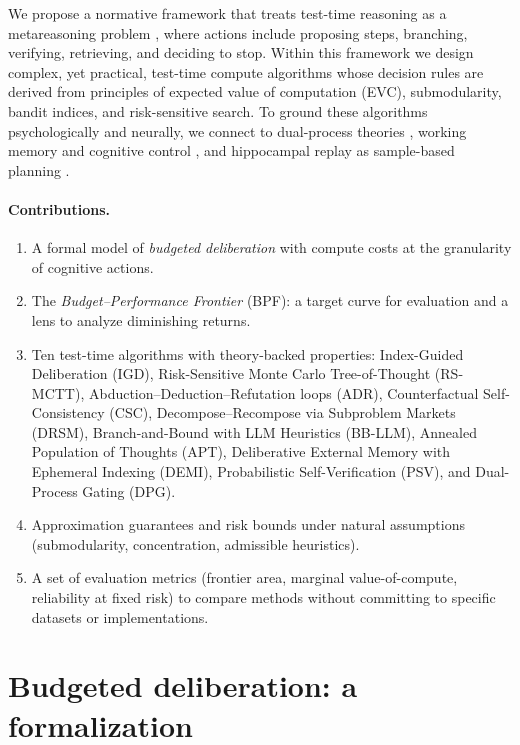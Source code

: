 \documentclass[11pt]{article}
\newcommand{\1}{\mathbb{I}}
\begin{document}
We propose a normative framework that treats test-time reasoning as a metareasoning problem \cite{russellwefald1991, horvitz1989, liedergriffiths2020}, where actions include proposing steps, branching, verifying, retrieving, and deciding to stop.
Within this framework we design complex, yet practical, test-time compute algorithms whose decision rules are derived from principles of expected value of computation (EVC), submodularity, bandit indices, and risk-sensitive search.
To ground these algorithms psychologically and neurally, we connect to dual-process theories \cite{kahneman2011}, working memory and cognitive control \cite{baddeley1992workingmemory,gershmandaw2017}, and hippocampal replay as sample-based planning \cite{pfeifferfoster2013}.

\paragraph{Contributions.}
\begin{enumerate}[leftmargin=1.6em, itemsep=0.25em, topsep=0.25em]
    \item A formal model of \emph{budgeted deliberation} with compute costs at the granularity of cognitive actions.
    \item The \emph{Budget--Performance Frontier} (BPF): a target curve for evaluation and a lens to analyze diminishing returns.
    \item Ten test-time algorithms with theory-backed properties: 
    Index-Guided Deliberation (IGD), Risk-Sensitive Monte Carlo Tree-of-Thought (RS-MCTT), 
    Abduction--Deduction--Refutation loops (ADR), Counterfactual Self-Consistency (CSC), 
    Decompose--Recompose via Subproblem Markets (DRSM), Branch-and-Bound with LLM Heuristics (BB-LLM),
    Annealed Population of Thoughts (APT), Deliberative External Memory with Ephemeral Indexing (DEMI),
    Probabilistic Self-Verification (PSV), and Dual-Process Gating (DPG).
    \item Approximation guarantees and risk bounds under natural assumptions (submodularity, concentration, admissible heuristics).
    \item A set of evaluation metrics (frontier area, marginal value-of-compute, reliability at fixed risk) to compare methods without committing to specific datasets or implementations.
\end{enumerate}

\section{Budgeted deliberation: a formalization}
\end{document}
